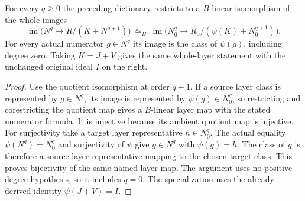 \begin{theorem}
\label{hir:actual-tangent-cut-whole-layer-dictionary}
\leanok
For every $q\ge0$ the preceding dictionary restricts to a $B$-linear
isomorphism of the whole images
\[
 \operatorname{im}\bigl(N^q\to R/(K+N^{q+1})\bigr)
 \ \simeq_B\
 \operatorname{im}\bigl(N_0^q\to R_0/(\psi(K)+N_0^{q+1})\bigr).
\]
For every actual numerator $g\in N^q$ its image is the class of
$\psi(g)$, including degree zero. Taking $K=J+V$ gives the same
whole-layer statement with the unchanged original ideal $I$ on the
right.
\end{theorem}
\begin{proof}
Use the quotient isomorphism at order $q+1$. If a source layer class
is represented by $g\in N^q$, its image is represented by
$\psi(g)\in N_0^q$, so restricting and corestricting the quotient
map gives a $B$-linear layer map with the stated numerator formula.
It is injective because its ambient quotient map is injective.
For surjectivity take a target layer representative $h\in N_0^q$.
The actual equality $\psi(N^q)=N_0^q$ and surjectivity of $\psi$
give $g\in N^q$ with $\psi(g)=h$. The class of $g$ is therefore a
source layer representative mapping to the chosen target class.
This proves bijectivity of the same named layer map. The argument
uses no positive-degree hypothesis, so it includes $q=0$. The
specialization uses the already derived identity $\psi(J+V)=I$.
\end{proof}

